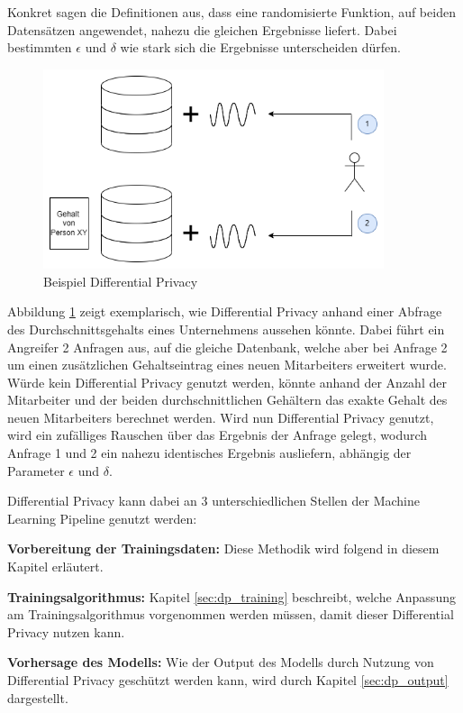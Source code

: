 Konkret sagen die Definitionen aus, dass eine randomisierte Funktion, auf beiden Datensätzen angewendet, nahezu die gleichen Ergebnisse liefert. 
Dabei bestimmten $\epsilon$ und $\delta$ wie stark sich die Ergebnisse unterscheiden dürfen.

\begin{figure}[!htb]
    \centering
    \includegraphics[width=10cm]{figures/dp}
    \caption{Beispiel Differential Privacy}
    \label{fig:dp}
\end{figure} 

Abbildung \ref{fig:dp} zeigt exemplarisch, wie Differential Privacy anhand einer Abfrage des Durchschnittsgehalts eines Unternehmens aussehen könnte.
Dabei führt ein Angreifer 2 Anfragen aus, auf die gleiche Datenbank, welche aber bei Anfrage 2 um einen zusätzlichen Gehaltseintrag eines neuen Mitarbeiters erweitert wurde.
Würde kein Differential Privacy genutzt werden, könnte anhand der Anzahl der Mitarbeiter und der beiden durchschnittlichen Gehältern das exakte Gehalt des neuen Mitarbeiters berechnet werden.
Wird nun Differential Privacy genutzt, wird ein zufälliges Rauschen über das Ergebnis der Anfrage gelegt, wodurch Anfrage 1 und 2 ein nahezu identisches Ergebnis ausliefern, abhängig der Parameter $\epsilon$ und $\delta$.

Differential Privacy kann dabei an 3 unterschiedlichen Stellen der Machine Learning Pipeline genutzt werden:
\begin{compactitem}
\item \textbf{Vorbereitung der Trainingsdaten:} Diese Methodik wird folgend in diesem Kapitel erläutert.
\item \textbf{Trainingsalgorithmus:} Kapitel \ref{sec:dp_training} beschreibt, welche Anpassung am Trainingsalgorithmus vorgenommen werden müssen, damit dieser Differential Privacy nutzen kann.
\item \textbf{Vorhersage des Modells:} Wie der Output des Modells durch Nutzung von Differential Privacy geschützt werden kann, wird durch Kapitel \ref{sec:dp_output} dargestellt.
\end{compactitem}


